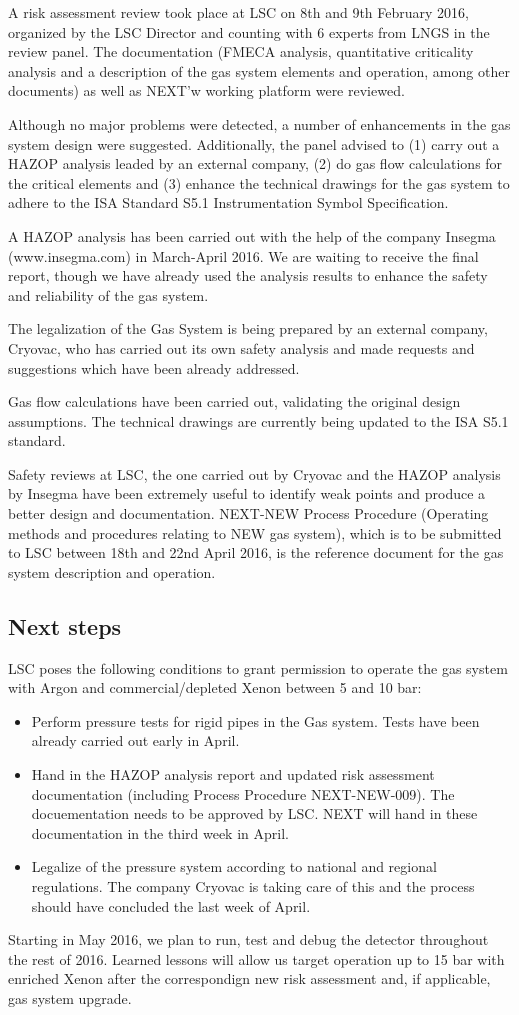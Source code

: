 \documentclass[11pt]{article}
\begin{document}
A risk assessment review took place at LSC on 8th and 9th February 2016, organized by the LSC Director and counting with 6 experts from LNGS in the review panel.
The documentation (FMECA analysis, quantitative criticality analysis and a description of the gas system elements and operation, among other documents) as well as NEXT'w working 
platform were reviewed.

Although no major problems were detected, a number of enhancements in the gas system design were suggested. 
Additionally, the panel advised to (1) carry out a HAZOP analysis leaded by an external company, (2) do gas flow calculations for the critical elements and 
(3) enhance the technical drawings for the gas system to adhere to the ISA Standard S5.1 Instrumentation Symbol Specification. 

A HAZOP analysis has been carried out with the help of the company Insegma (www.insegma.com) in March-April 2016. We are waiting to receive the final report, though we have already
used the analysis results to enhance the safety and reliability of the gas system.

The legalization of the Gas System is being prepared by an external company, Cryovac, who has carried out its own safety analysis and made requests and suggestions which have been already addressed.

Gas flow calculations have been carried out, validating the original design assumptions. The technical drawings are currently being updated to the ISA S5.1 standard.

Safety reviews at LSC, the one carried out by Cryovac and the HAZOP analysis by Insegma have been extremely useful to identify weak points and produce a better design and documentation. NEXT-NEW Process Procedure (Operating
methods and procedures relating to NEW gas system), which is to be submitted to LSC between 18th and 22nd April 2016, is the reference document for the gas system description and operation.

\subsection{Next steps}
LSC poses the following conditions to grant permission to operate the gas system with Argon and commercial/depleted Xenon between 5 and 10 bar: 
\begin{itemize}
\item Perform pressure tests for rigid pipes in the Gas system. Tests have been already carried out early in April.
\item Hand in the HAZOP analysis report and updated risk assessment documentation (including Process Procedure NEXT-NEW-009). The docuementation needs to be approved by LSC. NEXT will hand in these documentation in the third week in April.
\item Legalize of the pressure system according to national and regional regulations. The company Cryovac is taking care of this and the process should have concluded the last week of April.
\end{itemize}

Starting in May 2016, we plan to run, test and debug the detector throughout the rest of 2016. Learned lessons will allow us target operation up to 15 bar with enriched Xenon after the correspondign new risk assessment and, if applicable, gas system upgrade.
\end{document}
